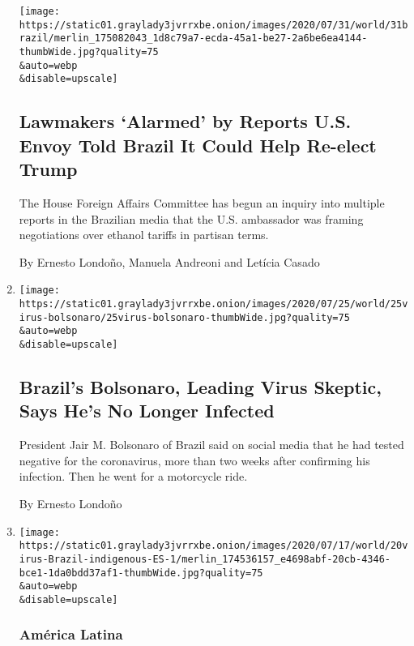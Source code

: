 \begin{enumerate}
  \texttt{[image: https://static01.graylady3jvrrxbe.onion/images/2020/07/31/world/31brazil/merlin\_175082043\_1d8c79a7-ecda-45a1-be27-2a6be6ea4144-thumbWide.jpg?quality=75\\\&auto=webp\\\&disable=upscale]}

  \hypertarget{lawmakers-alarmed-by-reports-us-envoy-told-brazil-it-could-help-re-elect-trump}{%
  \subsection{Lawmakers `Alarmed' by Reports U.S. Envoy Told Brazil It
  Could Help Re-elect
  Trump}\label{lawmakers-alarmed-by-reports-us-envoy-told-brazil-it-could-help-re-elect-trump}}

  The House Foreign Affairs Committee has begun an inquiry into multiple
  reports in the Brazilian media that the U.S. ambassador was framing
  negotiations over ethanol tariffs in partisan terms.

  By Ernesto Londoño, Manuela Andreoni and Letícia Casado
\item
  \href{/2020/07/25/world/americas/bolsonaro-coronavirus.html}{}

  \texttt{[image: https://static01.graylady3jvrrxbe.onion/images/2020/07/25/world/25virus-bolsonaro/25virus-bolsonaro-thumbWide.jpg?quality=75\\\&auto=webp\\\&disable=upscale]}

  \hypertarget{brazils-bolsonaro-leading-virus-skeptic-says-hes-no-longer-infected}{%
  \subsection{Brazil's Bolsonaro, Leading Virus Skeptic, Says He's No
  Longer
  Infected}\label{brazils-bolsonaro-leading-virus-skeptic-says-hes-no-longer-infected}}

  President Jair M. Bolsonaro of Brazil said on social media that he had
  tested negative for the coronavirus, more than two weeks after
  confirming his infection. Then he went for a motorcycle ride.

  By Ernesto Londoño
\item
  \href{/es/2020/07/20/espanol/america-latina/brasil-coronavirus-comunidades-indigenas.html}{}

  \texttt{[image: https://static01.graylady3jvrrxbe.onion/images/2020/07/17/world/20virus-Brazil-indigenous-ES-1/merlin\_174536157\_e4698abf-20cb-4346-bce1-1da0bdd37af1-thumbWide.jpg?quality=75\\\&auto=webp\\\&disable=upscale]}

  \hypertarget{amuxe9rica-latina}{%
  \subsubsection{América Latina}\label{amuxe9rica-latina}}


\end{enumerate}
